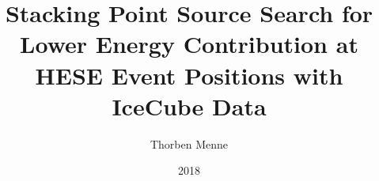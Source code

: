 

\author{Thorben Menne}
\title{Stacking Point Source Search for Lower Energy Contribution at HESE Event Positions with IceCube Data}
\date{2018}




\frontmatter
\maketitle
\tableofcontents

\mainmatter
% 
% 
% 

% 
% 

\appendix
% 

\backmatter
% 

% 


